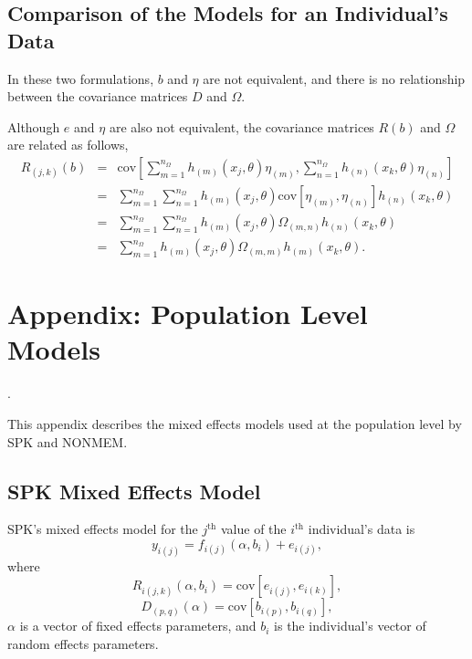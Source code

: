 \documentclass{article}
\begin{document}
\subsection{Comparison of the Models for an Individual's Data}

In these two formulations, $b$ and $\eta$ are not equivalent,
and  there is no relationship between the covariance matrices 
$D$ and $\Omega$.

Although $e$ and $\eta$ are also not equivalent, 
the covariance matrices $R(b)$ and 
$\Omega$ are related as follows,
  \begin{eqnarray*}
    R_{(j,k)}(b) & = &  \mbox{cov} \left[
      \sum_{m=1}^{n_{\Omega}} h_{(m)}(x_{j}, \theta) \eta_{(m)},
      \sum_{n=1}^{n_{\Omega}} h_{(n)}(x_{k}, \theta) \eta_{(n)} \right] \\
    & = & \sum_{m=1}^{n_{\Omega}} \sum_{n=1}^{n_{\Omega}} 
      h_{(m)}(x_{j}, \theta) 
      \mbox{cov} [ \eta_{(m)} , \eta_{(n)} ]
      h_{(n)}(x_{k}, \theta)  \\
    & = & \sum_{m=1}^{n_{\Omega}} \sum_{n=1}^{n_{\Omega}} 
      h_{(m)}(x_{j}, \theta) 
      \Omega_{(m,n)}
      h_{(n)}(x_{k}, \theta) \\
    & = & \sum_{m=1}^{n_{\Omega}}
      h_{(m)}(x_{j}, \theta) 
      \Omega_{(m,m)}
      h_{(m)}(x_{k}, \theta) .
  \end{eqnarray*}


\newpage


%
\section{Appendix: Population Level Models}
%

\label{App:PopLevelModels}.

This appendix describes the mixed effects models used at the
population level by SPK and NONMEM. 


\subsection{SPK Mixed Effects Model}

SPK's mixed effects model for the $j^{\mbox{th}}$ value of the
$i^{\mbox{th}}$ individual's data is 
  \begin{equation}
    y_{i(j)} = f_{i(j)}(\alpha, b_i) + e_{i(j)} ,
  \end{equation}
where
  \begin{equation}
    R_{i(j,k)}(\alpha, b_i) = \mbox{cov}[e_{i(j)},e_{i(k)}] ,
  \end{equation}
  \begin{equation}
    D_{(p,q)}(\alpha) = \mbox{cov}[b_{i(p)},b_{i(q)}] ,
  \end{equation}
$\alpha$ is a vector of fixed effects parameters, 
and $b_i$ is the individual's vector of random effects parameters.
\end{document}
